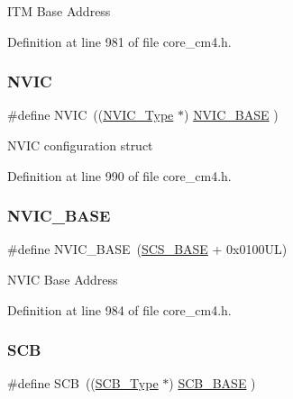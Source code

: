 I\+TM Base Address 

Definition at line 981 of file core\+\_\+cm4.\+h.

\mbox{\label{group___c_m_s_i_s__core__register_gac8e97e8ce56ae9f57da1363a937f8a17}} 
\subsubsection{\texorpdfstring{N\+V\+IC}{NVIC}}
{\footnotesize\ttfamily \#define N\+V\+IC~((\hyperlink{struct_n_v_i_c___type}{N\+V\+I\+C\+\_\+\+Type}      $\ast$)     \hyperlink{group___c_m_s_i_s__core__register_gaa0288691785a5f868238e0468b39523d}{N\+V\+I\+C\+\_\+\+B\+A\+SE}     )}

N\+V\+IC configuration struct 

Definition at line 990 of file core\+\_\+cm4.\+h.

\mbox{\label{group___c_m_s_i_s__core__register_gaa0288691785a5f868238e0468b39523d}} 
\subsubsection{\texorpdfstring{N\+V\+I\+C\+\_\+\+B\+A\+SE}{NVIC\_BASE}}
{\footnotesize\ttfamily \#define N\+V\+I\+C\+\_\+\+B\+A\+SE~(\hyperlink{group___c_m_s_i_s__core__register_ga3c14ed93192c8d9143322bbf77ebf770}{S\+C\+S\+\_\+\+B\+A\+SE} +  0x0100\+U\+L)}

N\+V\+IC Base Address 

Definition at line 984 of file core\+\_\+cm4.\+h.

\mbox{\label{group___c_m_s_i_s__core__register_gaaaf6477c2bde2f00f99e3c2fd1060b01}} 
\subsubsection{\texorpdfstring{S\+CB}{SCB}}
{\footnotesize\ttfamily \#define S\+CB~((\hyperlink{struct_s_c_b___type}{S\+C\+B\+\_\+\+Type}       $\ast$)     \hyperlink{group___c_m_s_i_s__core__register_gad55a7ddb8d4b2398b0c1cfec76c0d9fd}{S\+C\+B\+\_\+\+B\+A\+SE}      )}

